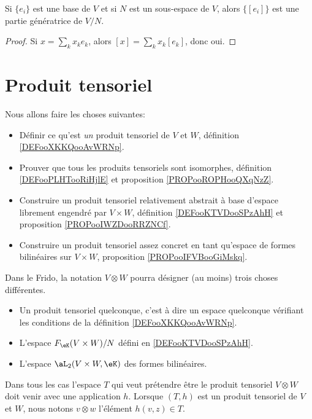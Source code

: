 \begin{proposition}
	Si \( \{ e_i \}\) est une base de \( V\) et si \( N\) est un sous-espace de \( V\), alors \( \{ [e_i] \}\) est une partie génératrice de \( V/N\).
\end{proposition}

\begin{proof}
	Si \( x=\sum_kx_ke_k\), alors \( [x]=\sum_kx_k[e_k]\), donc oui.
\end{proof}

\section{Produit tensoriel}

Nous allons faire les choses suivantes:
\begin{itemize}
	\item
	      Définir ce qu'est \emph{un} produit tensoriel de \( V\) et \( W\), définition \ref{DEFooXKKQooAvWRNp}.
	\item
	      Prouver que tous les produits tensoriels sont isomorphes, définition \ref{DEFooPLHTooRiHjlE} et proposition \ref{PROPooROPHooQXqNzZ}.
	\item
	      Construire un produit tensoriel relativement abstrait à base d'espace librement engendré par \( V\times W\), définition \ref{DEFooKTVDooSPzAhH} et proposition \ref{PROPooIWZDooRRZNCf}.
	\item
	      Construire un produit tensoriel assez concret en tant qu'espace de formes bilinéaires sur \( V\times W\), proposition \ref{PROPooIFVBooGiMskq}.
\end{itemize}

\begin{normaltext}
	Dans le Frido, la notation \( V\otimes W\) pourra désigner (au moins) trois choses différentes.
	\begin{itemize}
		\item
		      Un produit tensoriel quelconque, c'est à dire un espace quelconque vérifiant les conditions de la définition \ref{DEFooXKKQooAvWRNp}.
		\item
		      L'espace $F_{\eK}(V\times W)/N$ défini en \ref{DEFooKTVDooSPzAhH}.
		\item
		      L'espace \( \aL_2(V\times W,\eK)\) des formes bilinéaires.
	\end{itemize}
	Dans tous les cas l'espace \( T\) qui veut prétendre être le produit tensoriel \( V\otimes W\) doit venir avec une application \( h\). Lorsque \( (T,h)\) est un produit tensoriel de \( V\) et \( W\), nous notons \( v\otimes w\) l'élément \( h(v,z)\in T\).
\end{normaltext}

